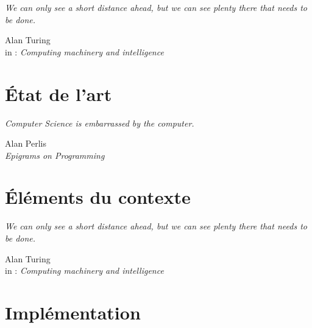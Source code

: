 \documentclass[11pt,a4paper,oneside]{report}
\begin{document}
\vspace*{\fill} \epigraph{\itshape We can only see a short distance ahead, but we can see plenty there that needs to be done.}{\vspace*{12pt}  Alan Turing\\
	in : \og{} \textit{Computing machinery and intelligence}\fg{}}
\vfill\clearpage


	
	
\chapter{État de l'art}

\vspace*{\fill} \epigraph{\itshape Computer Science is embarrassed by the computer.}{\vspace*{12pt} Alan Perlis\\\textit{Epigrams on Programming}}
\vfill\clearpage
 

	

\chapter{Éléments du contexte}

\vspace*{\fill} \epigraph{\itshape We can only see a short distance ahead, but we can see plenty there that needs to be done.}{\vspace*{12pt}  Alan Turing\\
	in : \og{} \textit{Computing machinery and intelligence}\fg{}}
\vfill\clearpage

	
	
\chapter{Implémentation}
\end{document}
